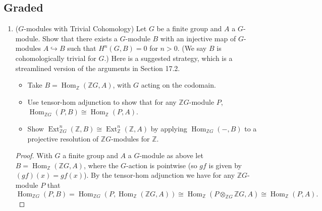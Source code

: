 \documentclass[11pt]{article}
\DeclareMathOperator{\Hom}{Hom}
\DeclareMathOperator{\Ext}{Ext}
\begin{document}
\subsection*{Graded}
\begin{enumerate}
    \item ($G$-modules with Trivial Cohomology) Let $G$ be a finite group and $A$ a $G$-module. Show that there exists a $G$-module $B$ with an injective map of $G$-modules $A\hookrightarrow B$ such that $H^n(G,B) = 0$ for $n>0$. (We say $B$ is cohomologically trivial for $G$.) Here is a suggested strategy, which is a streamlined version of the arguments in Section 17.2. \begin{itemize}
        \item Take $B = \Hom_{\mathbb{Z}}(\mathbb{Z}G, A)$, with $G$ acting on the codomain.
        \item Use tensor-hom adjunction to show that for any $\mathbb{Z}G$-module $P$, $\Hom_{\mathbb{Z}G}(P,B)\cong \Hom_\mathbb{Z}(P,A)$.
        \item Show $\Ext_{\mathbb{Z}G}^n(\mathbb{Z},B)\cong \Ext_\mathbb{Z}^n(\mathbb{Z},A)$ by applying $\Hom_{\mathbb{Z}G}(-,B)$ to a projective resolution of $\mathbb{Z}G$-modules for $\mathbb{Z}$.
    \end{itemize} \begin{proof}
        With $G$ a finite group and $A$ a $G$-module as above let $B = \Hom_{\mathbb{Z}}(\mathbb{Z}G,A)$, where the $G$-action is pointwise (so $gf$ is given by $(gf)(x) = gf(x)$). By the tensor-hom adjunction we have for any $\mathbb{Z}G$-module $P$ that \[\Hom_{\mathbb{Z}G}(P,B) = \Hom_{\mathbb{Z}G}(P,\Hom_{\mathbb{Z}}(\mathbb{Z}G,A))\cong \Hom_{\mathbb{Z}}(P\otimes_{\mathbb{Z}G}\mathbb{Z}G, A) \cong \Hom_\mathbb{Z}(P,A).\]


\end{proof}
\end{enumerate}
\end{document}
